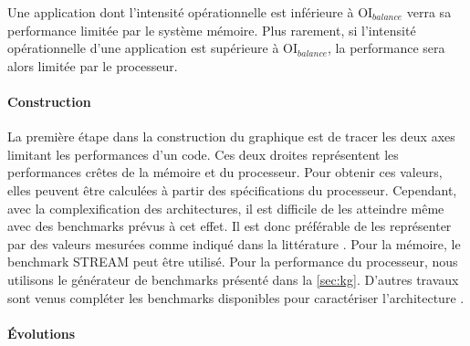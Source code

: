             Une application dont l’intensité opérationnelle est inférieure à $\text{OI}_{balance}$ verra sa performance limitée par le système mémoire. Plus rarement, si l’intensité opérationnelle d’une application est supérieure à $\text{OI}_{balance}$, la performance sera alors limitée par le processeur.

        \paragraph{Construction}

            La première étape dans la construction du graphique est de tracer les deux axes limitant les performances d’un code. Ces deux droites représentent les performances crêtes de la mémoire et du processeur. Pour obtenir ces valeurs, elles peuvent être calculées à partir des spécifications du processeur. Cependant, avec la complexification des architectures, il est difficile de les atteindre même avec des benchmarks prévus à cet effet. Il est donc préférable de les représenter par des valeurs mesurées comme indiqué dans la littérature  \cite{farjallah2014preparing}. Pour la mémoire, le benchmark STREAM peut être utilisé. Pour la performance du processeur, nous utilisons le générateur de benchmarks présenté dans la \autoref{sec:kg}. D’autres travaux sont venus compléter les benchmarks disponibles pour caractériser l’architecture \cite{lo2014roofline}.
        
        \paragraph{Évolutions}

